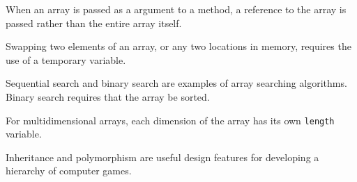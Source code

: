 \begin{SMBL}
\item When an array is passed as a argument to a method, a reference
to the array is passed rather than the entire array itself.

\item  Swapping two elements of an array, or any
two locations in memory, requires the use of a temporary variable.

\item Sequential search and binary search are examples of array
searching algorithms.  Binary search requires that the array be
sorted.

\item For multidimensional arrays, each dimension of the array has its
own {\tt length} variable.

\item Inheritance and polymorphism are useful design features for
developing a hierarchy of computer games. 

\end{SMBL}


\secANSHleft


